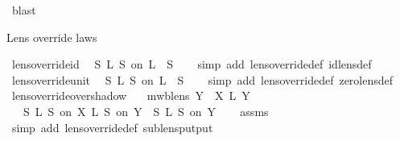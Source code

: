 \begin{isabellebody}
\ blast\isanewline
{}\isamarkupfalse%
%
\endisatagproof
{\isafoldproof}%
%
\isadelimproof
%
\endisadelimproof
%
\begin{isamarkuptext}%
Lens override laws%
\end{isamarkuptext}\isamarkuptrue%
\isamarkupfalse%
\ lens{\isacharunderscore}override{\isacharunderscore}id{\isacharcolon}\isanewline
\ \ {\isachardoublequoteopen}S\ {\isasymoplus}\isactrlsub L\ S\ on\ {}\isactrlsub L\ {\isacharequal}\ S\isanewline
%
\isadelimproof
\ \ %
\endisadelimproof
%
\isatagproof
{}\isamarkupfalse%
\ {\isacharparenleft}simp\ add{\isacharcolon}\ lens{\isacharunderscore}override{\isacharunderscore}def\ id{\isacharunderscore}lens{\isacharunderscore}def{\isacharparenright}%
\endisatagproof
{\isafoldproof}%
%
\isadelimproof
\isanewline
%
\endisadelimproof
\isanewline
{}\isamarkupfalse%
\ lens{\isacharunderscore}override{\isacharunderscore}unit{\isacharcolon}\isanewline
\ \ {\isachardoublequoteopen}S\ {\isasymoplus}\isactrlsub L\ S\ on\ {}\isactrlsub L\ {\isacharequal}\ S\isanewline
%
\isadelimproof
\ \ %
\endisadelimproof
%
\isatagproof
{}\isamarkupfalse%
\ {\isacharparenleft}simp\ add{\isacharcolon}\ lens{\isacharunderscore}override{\isacharunderscore}def\ zero{\isacharunderscore}lens{\isacharunderscore}def{\isacharparenright}%
\endisatagproof
{\isafoldproof}%
%
\isadelimproof
\isanewline
%
\endisadelimproof
\isanewline
{}\isamarkupfalse%
\ lens{\isacharunderscore}override{\isacharunderscore}overshadow{\isacharcolon}\isanewline
\ \ \ {\isachardoublequoteopen}mwb{\isacharunderscore}lens\ Y{\isachardoublequoteclose}\ \ {\isachardoublequoteopen}X\ {\isasymsubseteq}\isactrlsub L\ Y{\isachardoublequoteclose}\isanewline
\ \ \ {\isachardoublequoteopen}{\isacharparenleft}S\ {\isasymoplus}\isactrlsub L\ S\ on\ X{\isacharparenright}\ {\isasymoplus}\isactrlsub L\ S\ on\ Y\ {\isacharequal}\ S\ {\isasymoplus}\isactrlsub L\ S\ on\ Y{\isachardoublequoteclose}\isanewline
%
\isadelimproof
\ \ %
\endisadelimproof
%
\isatagproof
{}\isamarkupfalse%
\ assms\ \isamarkupfalse%
\ {\isacharparenleft}simp\ add{\isacharcolon}\ lens{\isacharunderscore}override{\isacharunderscore}def\ sublens{\isacharunderscore}put{\isacharunderscore}put{\isacharparenright}%

\end{isabellebody}
